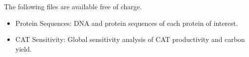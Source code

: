 \documentclass[journal=asbcd6,manuscript=article]{achemso}
\begin{document}
\begin{suppinfo}

The following files are available free of charge.
\begin{itemize}
  \item Protein Sequences: DNA and protein sequences of each protein of interest.
  \item CAT Sensitivity: Global sensitivity analysis of CAT productivity and carbon yield.
\end{itemize}

\end{suppinfo}


\end{document}

